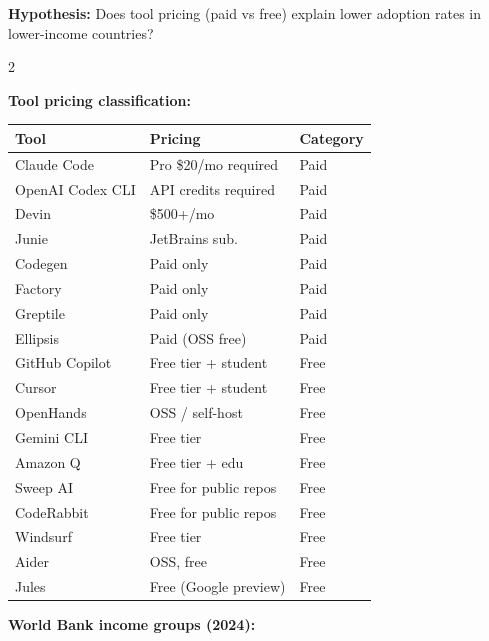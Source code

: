 \documentclass[10pt,a4paper]{article}
\begin{document}
\textbf{Hypothesis:} Does tool pricing (paid vs free) explain lower adoption rates in lower-income countries?

\vspace{6pt}
\begin{multicols}{2}

\textbf{Tool pricing classification:}

\begin{tabular}{@{}lll@{}}
\toprule
Tool & Pricing & Category \\
\midrule
Claude Code       & Pro \$20/mo required  & Paid \\
OpenAI Codex CLI  & API credits required  & Paid \\
Devin             & \$500+/mo             & Paid \\
Junie             & JetBrains sub.        & Paid \\
Codegen           & Paid only             & Paid \\
Factory           & Paid only             & Paid \\
Greptile          & Paid only             & Paid \\
Ellipsis          & Paid (OSS free)       & Paid \\
\midrule
GitHub Copilot    & Free tier + student   & Free \\
Cursor            & Free tier + student   & Free \\
OpenHands         & OSS / self-host       & Free \\
Gemini CLI        & Free tier             & Free \\
Amazon Q          & Free tier + edu       & Free \\
Sweep AI          & Free for public repos & Free \\
CodeRabbit        & Free for public repos & Free \\
Windsurf          & Free tier             & Free \\
Aider             & OSS, free             & Free \\
Jules             & Free (Google preview) & Free \\
\bottomrule
\end{tabular}

\columnbreak

\textbf{World Bank income groups (2024):}


\end{multicols}
\end{document}
